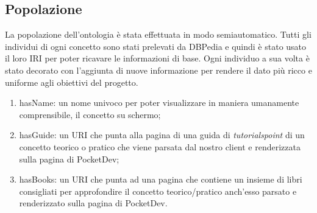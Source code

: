 \subsection{Popolazione}
La popolazione dell'ontologia è stata effettuata in modo semiautomatico. Tutti gli individui di ogni concetto sono stati prelevati da DBPedia e quindi è stato usato il loro IRI per poter ricavare le informazioni di base. Ogni individuo a sua volta è stato decorato con l'aggiunta di nuove informazione per rendere il dato più ricco e uniforme agli obiettivi del progetto. 
\begin{enumerate}
 \item hasName: un nome univoco per poter visualizzare in maniera umanamente comprensibile, il concetto su schermo;
 \item hasGuide: un URI che punta alla pagina di una guida di \textit{tutorialspoint} di un concetto teorico o pratico che viene  parsata dal nostro client e renderizzata sulla pagina di PocketDev;
 \item hasBooks: un URI che punta ad una pagina che contiene un insieme di libri consigliati per approfondire il concetto teorico/pratico anch'esso parsato e renderizzato sulla pagina di PocketDev.
\end{enumerate}
